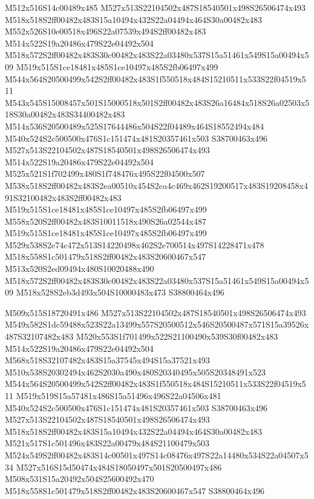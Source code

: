 \documentclass{article}
\begin{document}
\begin{multicols}{2}
M512x516S14c00489x485 M527x513S22104502x487S18540501x498S26506474x493 M518x518S2ff00482x483S15a10494x432S22a04494x464S30a00482x483 M552x526S10e00518x496S22a07539x494S2ff00482x483 M514x522S19a20486x479S22e04492x504 M518x572S2ff00482x483S30c00482x483S22a03480x537S15a51461x549S15a00494x509 M519x515S1ce18481x485S1ce10497x485S2fb06497x499 M544x564S20500499x542S2ff00482x483S1f550518x484S15210511x533S22f04519x511 M543x545S15008457x501S15000518x501S2ff00482x483S26a16484x518S26a02503x518S30a00482x483S34400482x483 M514x536S20500489x525S17644486x504S22f04489x464S18552494x484 M540x524S2c500500x476S1c151474x481S20357461x503 S38700463x496 M527x513S22104502x487S18540501x498S26506474x493 M514x522S19a20486x479S22e04492x504 M525x521S1f702499x480S1f748476x495S22f04500x507 M538x518S2ff00482x483S2ea00510x454S2ea4c469x462S19200517x483S19208458x491S32100482x483S2ff00482x483 M519x515S1ce18481x485S1ce10497x485S2fb06497x499 M558x520S2ff00482x483S10011518x490S26a02544x487 M519x515S1ce18481x485S1ce10497x485S2fb06497x499 M529x538S2e74c472x513S14220498x462S2e700514x497S14228471x478 M518x558S1c501479x518S2ff00482x483S20600467x547 M513x520S2ed09494x480S10020488x490 M518x572S2ff00482x483S30c00482x483S22a03480x537S15a51461x549S15a00494x509 M518x528S2eb3d493x504S10000483x473 S38800464x496

M509x515S18720491x486 M527x513S22104502x487S18540501x498S26506474x493 M549x582S1dc59488x523S22a13499x557S20500512x546S20500487x571S15a39526x487S32107482x483 M520x553S1f701499x522S21100490x539S30f00482x483 M514x522S19a20486x479S22e04492x504 M568x518S32107482x483S15a37545x494S15a37521x493 M510x538S20302494x462S2030a490x480S20340495x505S20348491x523 M544x564S20500499x542S2ff00482x483S1f550518x484S15210511x533S22f04519x511 M519x519S15a57481x486S15a51496x496S22a04506x481 M540x524S2c500500x476S1c151474x481S20357461x503 S38700463x496 M527x513S22104502x487S18540501x498S26506474x493 M518x518S2ff00482x483S15a10494x432S22a04494x464S30a00482x483 M521x517S1c501496x483S22a00479x484S21100479x503 M524x549S2ff00482x483S14c00501x497S14c08476x497S22a14480x534S22a04507x534 M527x516S15d50474x484S18050497x501S20500497x486 M508x531S15a20492x504S25600492x470 M518x558S1c501479x518S2ff00482x483S20600467x547 S38800464x496


\end{multicols}
\end{document}
